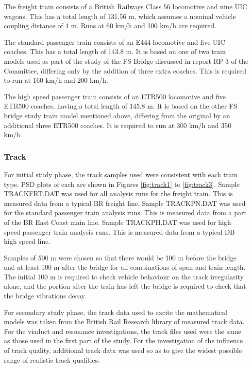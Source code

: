 The freight train consists of a British Railways Class 56 locomotive and nine UIC wagons. This has a total length of 131.56 m, which assumes a nominal vehicle coupling distance of 4 m. Runs at 60 km/h and 100 km/h are required.

The standard passenger train consists of an E444 locomotive and five UIC coaches. This has a total length of 143.8 m. It is based on one of two train models used as part of the study of the FS Bridge discussed in report RP 3 of the Committee, differing only by the addition of three extra coaches. This is required to run at 160 km/h and 200 km/h.

The high speed passenger train consists of an ETR500 locomotive and five ETR500 coaches, having a total length of 145.8 m. It is based on the other FS bridge study train model mentioned above, differing from the original by an additional three ETR500 coaches. It is required to run at 300 km/h and 350 km/h.

\subsubsection{Track}

For initial study phase, the track samples used were consistent with each train type. PSD plots of each are shown in Figures \ref{fig:track1} to \ref{fig:track3}. Sample TRACKFRT.DAT was used for all analysis runs for the freight train. This is measured data from a typical BR freight line. Sample TRACKPN.DAT was used for the standard passenger train analysis runs. This is measured data from a part of the BR East Coast main line. Sample TRACKPH.DAT was used for high speed passenger train analysis runs. This is measured data from a typical DB high speed line.

Samples of 500 m were chosen so that there would be 100 m before the bridge and at least 100 m after the bridge for all combinations of span and train length. The initial 100 m is required to check vehicle behaviour on the track irregularity alone, and the portion after the train has left the bridge is required to check that the bridge vibrations decay.

For secondary study phase, the track data used to excite the mathematical models was taken from the British Rail Research library of measured track data. For the viaduct and resonance investigations, the track files used were the same as those used in the first part of the study. For the investigation of the influence of track quality, additional track data was used so as to give the widest possible range of realistic track qualities.

